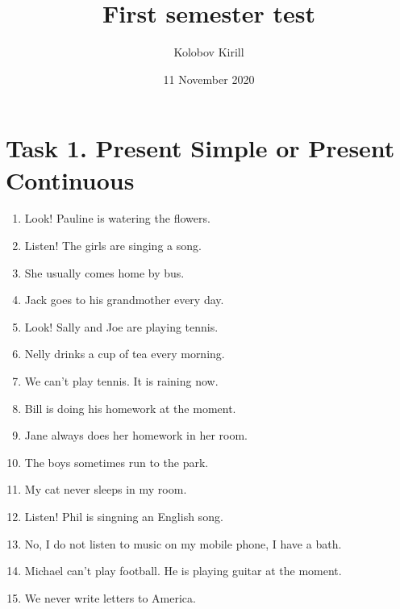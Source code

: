 \documentclass[a4paper,12pt]{report}
\author{Kolobov Kirill}
\title{First semester test}
\date{11 November 2020}
\begin{document}
\maketitle

\section*{Task 1. Present Simple or Present Continuous}
\begin{enumerate}
    \item{Look! Pauline is watering the flowers.}
    \item{Listen! The girls are singing a song.}
    \item{She usually comes home by bus.}
    \item{Jack goes to his grandmother every day.}
    \item{Look! Sally and Joe are playing tennis.}
    \item{Nelly drinks a cup of tea every morning.}
    \item{We can't play tennis. It is raining now.} 
    \item{Bill is doing his homework at the moment.}
    \item{Jane always does her homework in her room.}
    \item{The boys sometimes run to the park.} 
    \item{My cat never sleeps in my room.}
    \item{Listen! Phil is singning an English song.}
    \item{No, I do not listen to music on my mobile phone, I have a bath.}
    \item{Michael can't play football. He is playing guitar at the moment.}
    \item{We never write letters to America.}
\end{enumerate}
\end{document}
